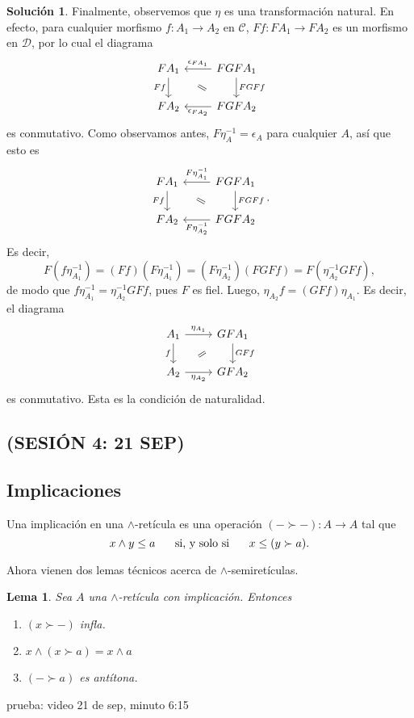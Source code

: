 \documentclass[12pt,letterpaper,titlepage]{article}
\newtheorem*{lemma}{Lema}
\theoremstyle{definition}
\newtheorem*{sol}{Solución}
\renewcommand\inf{\wedge}
\renewcommand\cal[1]{\mathcal{#1}}
\newcommand\ssi{\hspace{5mm}\text{ si, y solo si }\hspace{5mm}}
\newcommand\com[2]{\ar[equal,from={#1},to={#2},shorten=5mm]}
\newcommand\<{\langle}
\renewcommand\>{\rangle}
\begin{document}
\begin{sol}
    Finalmente, observemos que $\eta$ es una transformación natural.
    En efecto, para cualquier morfismo $f:A_1\to A_2$ en $\cal C$,
    $Ff:FA_1\to FA_2$ es un morfismo en $\cal D$, por lo cual el diagrama
    \[
        \begin{tikzcd}
            FA_1 \ar[d,"Ff"']
            & FGFA_1 \ar[l,"\epsilon_{FA_1}"'] \ar[d,"FGFf"] \\
            FA_2 & FGFA_2 \ar[l,"\epsilon_{FA_2}"]
            \com{1-1}{2-2}
        \end{tikzcd}
    \]
    es conmutativo.
    Como observamos antes, $F\eta_A^{-1}=\epsilon_A$ para cualquier $A$, así
    que esto es
    \[
        \begin{tikzcd}
            FA_1 \ar[d,"Ff"']
            & FGFA_1 \ar[l,"F\eta_{A_1}^{-1}"'] \ar[d,"FGFf"] \\
            FA_2 & FGFA_2 \ar[l,"F\eta_{A_2}^{-1}"]
            \com{1-1}{2-2}
        \end{tikzcd}
    .\]
    Es decir,
    \[
        F(f\eta_{A_1}^{-1})
        =(Ff)(F\eta_{A_1}^{-1})
        =(F\eta_{A_2}^{-1})(FGFf)
        =F(\eta_{A_2}^{-1}GFf)
    ,\]
    de modo que $f\eta_{A_1}^{-1}=\eta_{A_2}^{-1}GFf$, pues $F$ es fiel.
    Luego, $\eta_{A_2}f=(GFf)\eta_{A_1}$.
    Es decir, el diagrama
    \[
        \begin{tikzcd}
            A_1 \ar[d,"f"'] \ar[r,"\eta_{A_1}"]
            & GFA_1 \ar[d,"GFf"] \\
            A_2 \ar[r,"\eta_{A_2}"'] & GFA_2
            \com{1-2}{2-1}
        \end{tikzcd}
    \]
    es conmutativo.
    Esta es la condición de naturalidad.
\end{sol}

\subsection*{(SESIÓN 4: 21 SEP)}

\subsection{Implicaciones}

Una implicación en una $\inf$-retícula es una operación
$(-\succ -):A\to A$ tal que
\[
  x\inf y\leq a \ssi x\leq (y\succ a )
.\]

Ahora vienen dos lemas técnicos acerca de $\inf$-semiretículas.

\begin{lemma}
  Sea $A$ una $\inf$-retícula con implicación.
  Entonces
  \begin{enumerate}
    \item $(x\succ -)$ infla.
    \item $x\inf(x\succ a) = x\inf a$
    \item $(-\succ a)$ es antítona.
  \end{enumerate}
\end{lemma}
prueba: video 21 de sep, minuto 6:15
\end{document}
